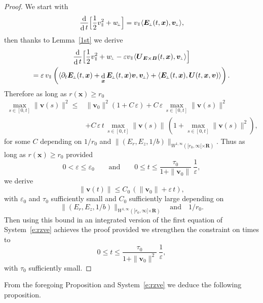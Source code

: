 \documentclass[JEP,XML,SOM,Unicode]{cedram}
\newcommand{\sperp}{{\scriptscriptstyle\perp}}
\let\eps\varepsilon
\let\d\partial
\DeclareMathOperator\dD{d}\let\dd\dD
\theoremstyle{plain}
\theoremstyle{definition}
\newcommand\R{\mathbf R}
\newcommand\bB{{\boldsymbol B}}
\newcommand\bE{{\boldsymbol E}}
\newcommand\bU{{\boldsymbol U}}
\newcommand\bfv{{\boldsymbol v}}
\newcommand\bfx{{\boldsymbol x}}
\newcommand\vpar{v_\mypar}
\newcommand\bvperp{\bfv_{\!\sperp}}
\newcommand\eperp{w_{\!\sperp}}
\newcommand\Eperp{\bE_{\!\sperp}}
\newcommand\Er{E_r}
\newcommand\Ez{E_z}
\newcommand{\EcB}{\bU_{\bE\times\bB}}
\newcommand{\mypar}{{\mkern3mu\vphantom{\perp}\vrule depth 0pt\mkern2mu\vrule depth 0pt\mkern3mu}}
\begin{document}
\begin{proof}
We start with
\[
\frac{\dD}{\dD t}\Bigl[\frac12\vpar^2+\eperp\Bigr]
=\vpar\langle \Eperp(t,\bfx),\bvperp\rangle,
\]
then thanks to Lemma~\ref{1st} we derive
\begin{multline*}
\frac{\dD}{\dD t}\Bigl[\frac12\vpar^2+\eperp
-\eps\vpar\langle\EcB(t,\bfx),\bvperp\rangle\Bigr]
\\
=\eps\,\vpar\left(\langle \d_t\Eperp(t,\bfx)+\dD_\bfx\Eperp(t,\bfx)\bfv,\bvperp\rangle
+\langle \Eperp(t,\bfx),\bU(t,\bfx,\bfv)\rangle\right).
\end{multline*}
Therefore as long as $r(\bfx)\geq r_0$
\begin{align*}
\max_{s\in[0,t]}\|\bfv(s)\|^2\leq{}&
\|\bfv_0\|^2(1+C\,\eps)+C\,\eps\,\max_{s\in[0,t]}\|\bfv(s)\|^2
\\
&+C\,\eps\,t\,\max_{s\in[0,t]}\|\bfv(s)\|\,(1+\max_{s\in[0,t]}\|\bfv(s)\|^2),
\end{align*}
for some $C$ depending on $1/r_0$ and $\|(\Er,\Ez,1/b)\|_{W^{1,\infty}([r_0,\infty[\times\R)}$. Thus as long as $r(\bfx)\geq r_0$ provided
\[
0<\eps\leq\eps_0\qquad\textrm{and}\qquad
0\leq t\leq \frac{\tau_0}{1+\|\bfv_0\|}\ \frac1\eps,
\]
we derive
\[
\|\bfv(t)\|\leq C_0\,(\|\bfv_0\|+\eps\,t),
\]
with $\eps_0$ and $\tau_0$ sufficiently small and $C_0$ sufficiently large
depending on
\[
\|(\Er,\Ez,1/b)\|_{W^{1,\infty}([r_0,\infty[\times\R)}\quad\text{and}\quad 1/r_0.
\]
Then using this bound in an integrated version of the first equation of System~\eqref{e:rzve} achieves the proof provided we strengthen the constraint on times to
\[
0\leq t\leq \frac{\tau_0}{1+\|\bfv_0\|^2}\ \frac1\eps,
\]
with $\tau_0$ sufficiently small.
\end{proof}

From the foregoing Proposition and System~\eqref{e:rzve} we deduce the following proposition.
\end{document}
